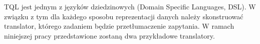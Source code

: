 TQL jest jednym z języków dziedzinowych (Domain Specific Languages, DSL). 
W związku z tym dla każdego sposobu reprezentacji danych należy skonstruować translator, 
którego zadaniem będzie przetłumaczenie zapytania. 
W ramach niniejszej pracy przedstawione zostaną dwa przykładowe translatory.

